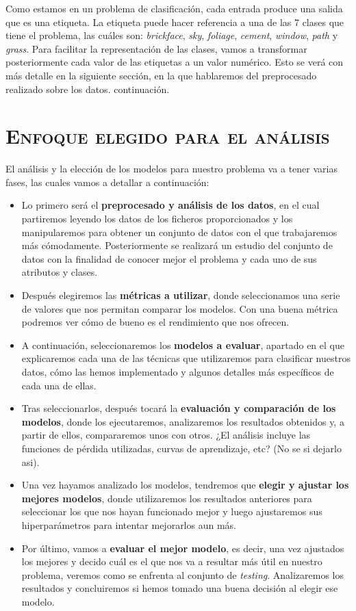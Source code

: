 \documentclass[11pt,a4paper]{article}
\begin{document}
Como estamos en un problema de clasificación, cada entrada produce una salida que es una etiqueta. La etiqueta puede hacer
referencia a una de las 7 clases que tiene el problema, las cuáles son: \textit{brickface}, \textit{sky},
\textit{foliage}, \textit{cement}, \textit{window}, \textit{path} y \textit{grass}. Para facilitar la representación de
las clases, vamos a transformar posteriormente cada valor de las etiquetas a un valor numérico. Esto se verá con más
detalle en la siguiente sección, en la que hablaremos del preprocesado realizado sobre los datos.
continuación.

\newpage

\section{\textsc{Enfoque elegido para el análisis}}

El análisis y la elección de los modelos para nuestro problema va a tener varias fases, las cuales vamos a detallar a continuación:
\begin{itemize}[label=\textbullet]
\item Lo primero será el \textbf{preprocesado y análisis de los datos}, en el cual partiremos leyendo los datos de los ficheros
proporcionados y los manipularemos para obtener un conjunto de datos con el que trabajaremos más cómodamente. Posteriormente se realizará
un estudio del conjunto de datos con la finalidad de conocer mejor el problema y cada uno de sus atributos y clases.
\item Después elegiremos las \textbf{métricas a utilizar}, donde seleccionamos una serie de valores que nos permitan comparar los modelos.
Con una buena métrica podremos ver cómo de bueno es el rendimiento que nos ofrecen.
\item A continuación, seleccionaremos los \textbf{modelos a evaluar}, apartado en el que explicaremos cada una de las técnicas que
utilizaremos para clasificar nuestros datos, cómo las hemos implementado y algunos detalles más específicos de cada una de ellas.
\item Tras seleccionarlos, después tocará la \textbf{evaluación y comparación de los modelos}, donde los ejecutaremos, analizaremos los
resultados obtenidos y, a partir de ellos, compararemos unos con otros. ¿El análisis incluye las funciones de pérdida utilizadas, curvas
de aprendizaje, etc? (No se si dejarlo asi).
\item Una vez hayamos analizado los modelos, tendremos que \textbf{elegir y ajustar los mejores modelos}, donde utilizaremos los resultados
anteriores para seleccionar los que nos hayan funcionado mejor y luego ajustaremos sus hiperparámetros para intentar mejorarlos aun más.
\item Por último, vamos a \textbf{evaluar el mejor modelo}, es decir, una vez ajustados los mejores y decido cuál es el que nos va a resultar
más útil en nuestro problema, veremos como se enfrenta al conjunto de \textit{testing}. Analizaremos los resultados y concluiremos si
hemos tomado una buena decisión al elegir ese modelo.
\end{itemize}
\end{document}
